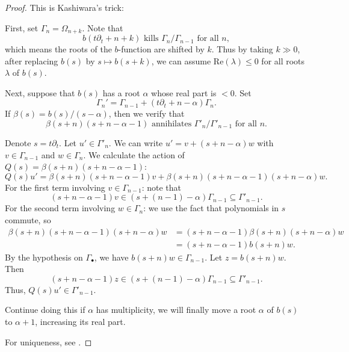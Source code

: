 \begin{proof}
    This is Kashiwara's trick:

    First, set $\Gamma_{n}=\Omega_{n+k}$. Note that
    \[
        b(t\partial_{t}+n+k)\text{ kills }\Gamma_{n} /\Gamma_{n-1}\text{ for all }n,
    \]
    which means the roots of the $b$-function are shifted by $k$.
    Thus by taking $k\gg 0$, after replacing $b(s)$ by $s\mapsto b(s+k)$, we can assume $\mathrm{Re}(\lambda)\le 0$ for all roots $\lambda$ of $b(s)$.

    Next, suppose that $b(s)$ has a root $\alpha$ whose real part is $< 0$.
    Set
    \[
        \Gamma_{n}'=\Gamma_{n-1}+(t\partial_{t}+n-\alpha)\Gamma_{n}.
    \]
    If $\beta(s) = b(s)/(s-\alpha)$, then we verify that
    \[
        \beta(s+n)(s+n-\alpha-1)\text{ annihilates }\Gamma'_{n} / \Gamma'_{n-1}\text{ for all }n.
    \]

    Denote $s = t\partial_t$. Let $u' \in \Gamma'_{n}$. We can write $u' = v + (s+n-\alpha)w$ with $v \in \Gamma_{n-1}$ and $w \in \Gamma_{n}$.
    We calculate the action of $Q(s) = \beta(s+n)(s+n-\alpha-1)$:
    \[
        Q(s)u' = \beta(s+n)(s+n-\alpha-1)v + \beta(s+n)(s+n-\alpha-1)(s+n-\alpha)w.
    \]
    For the first term involving $v \in \Gamma_{n-1}$: note that
    \[
        (s+n-\alpha-1)v \in (s+(n-1)-\alpha)\Gamma_{n-1} \subseteq \Gamma'_{n-1}.
    \]
    For the second term involving $w \in \Gamma_{n}$: we use the fact that polynomials in $s$ commute, so
    \begin{align*}
        \beta(s+n)(s+n-\alpha-1)(s+n-\alpha)w & = (s+n-\alpha-1) \beta(s+n)(s+n-\alpha) w \\
                                              & = (s+n-\alpha-1) b(s+n) w.
    \end{align*}
    By the hypothesis on $\Gamma_\bullet$, we have $b(s+n)w \in \Gamma_{n-1}$. Let $z = b(s+n)w$.
    Then
    \[
        (s+n-\alpha-1)z \in (s+(n-1)-\alpha)\Gamma_{n-1} \subseteq \Gamma'_{n-1}.
    \]
    Thus, $Q(s)u' \in \Gamma'_{n-1}$.

    Continue doing this if $\alpha$ has multiplicity, we will finally move a root $\alpha$ of $b(s)$ to $\alpha+1$, increasing its real part.

    For uniqueness, see \cite[2.10.24 The existence of the Kashiwara-Malgrange filtration]{Bjork1993AnalyticDModules}.

\end{proof}

